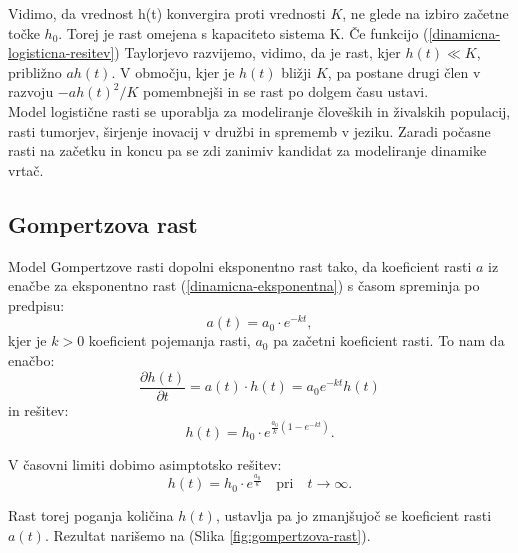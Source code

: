\documentclass[a4paper, twoside, 12pt]{book}
\begin{document}
    Vidimo, da vrednost h(t) konvergira proti vrednosti $K$, ne glede na izbiro začetne točke $h_0$. Torej je rast omejena s kapaciteto sistema K.
    Če funkcijo (\ref{dinamicna-logisticna-resitev}) Taylorjevo razvijemo, vidimo, da je rast, kjer $h(t) \ll K$, približno $a h(t)$. V območju, kjer je $h(t)$ bližji $K$, pa postane drugi člen v razvoju $-a h(t)^2 / K$ pomembnejši in se rast po dolgem času ustavi.\\
    Model logistične rasti se uporablja za modeliranje človeških in živalskih populacij, rasti tumorjev, širjenje inovacij v družbi in sprememb v jeziku. Zaradi počasne rasti na začetku in koncu pa se zdi zanimiv kandidat za modeliranje dinamike vrtač.


    \subsection{Gompertzova rast}

    Model Gompertzove rasti dopolni eksponentno rast tako, da koeficient rasti $a$ iz enačbe za eksponentno rast (\ref{dinamicna-eksponentna}) s časom spreminja po predpisu:
    \begin{equation}
      a(t) = a_0 \cdot e^{- k t},
      \label{dinamicna-gompertzova-faktor}
    \end{equation}
kjer je $k > 0$ koeficient pojemanja rasti, $a_0$ pa začetni koeficient rasti.
To nam da enačbo:
    \begin{equation}
      \frac{\partial h(t)}{\partial t} = a(t) \cdot h(t) = a_0 e^{ -k t} h(t)
      \label{dinamicna-gompertzova}
    \end{equation}
in rešitev:
    \begin{equation}
      h(t) = h_0 \cdot e^{\frac{a_0}{k}(1-e^{-kt})}.
      \label{dinamicna-gompertzova-resitev}
    \end{equation}

V časovni limiti dobimo asimptotsko rešitev:
    \begin{equation}
      h(t) = h_0 \cdot e^{\frac{a_0}{k}} \quad \text{pri} \quad t \rightarrow \infty.
      \label{dinamicna-gompertzova-limita}
    \end{equation}

Rast torej poganja količina $h(t)$, ustavlja pa jo zmanjšujoč se koeficient rasti $a(t)$. Rezultat narišemo na (Slika \ref{fig:gompertzova-rast}).
\end{document}
